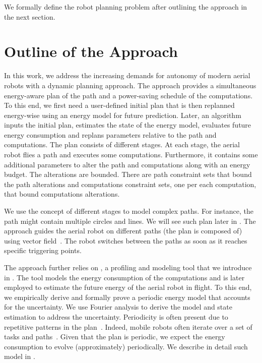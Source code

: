 We formally define the robot planning problem after outlining the approach in the next section.


\section{Outline of the Approach}
\label{sec:outline}

In this work, we address the increasing demands for autonomy of modern aerial robots with a dynamic planning approach. The approach provides a simultaneous energy-aware plan of the path and a power-saving schedule of the computations. To this end, we first need a user-defined initial plan that is then replanned energy-wise using an energy model for future prediction. Later, an algorithm inputs the initial plan, estimates the state of the energy model, evaluates future energy consumption and replans parameters relative to the path and computations. The plan consists of different stages. At each stage, the aerial robot flies a path and executes some computations. Furthermore, it contains some additional parameters to alter the path and computations along with an energy budget. The alterations are bounded. There are path constraint sets that bound the path alterations and computations constraint sets, one per each computation, that bound computations alterations.

We use the concept of different stages to model complex paths. For instance, the path might contain multiple circles and lines. We will see such plan later in . The approach guides the aerial robot on different paths (the plan is composed of) using vector field~\citep{de2017guidance}. The robot switches between the paths as soon as it reaches specific triggering points. 

The approach further relies on \powprof{}, a profiling and modeling tool that we introduce in . The tool models the energy consumption of the computations and is later employed to estimate the future energy of the aerial robot in flight. To this end, we empirically derive and formally prove a periodic energy model that accounts for the uncertainty. We use Fourier analysis to derive the model and state estimation to address the uncertainty. Periodicity is often present due to repetitive patterns in the plan~\citep{seewald2020mechanical}. Indeed, mobile robots often iterate over a set of tasks and paths~\citep{seewald202Xenergy}. Given that the plan is periodic, we expect the energy consumption to evolve (approximately) periodically. We describe in detail such model in . 

